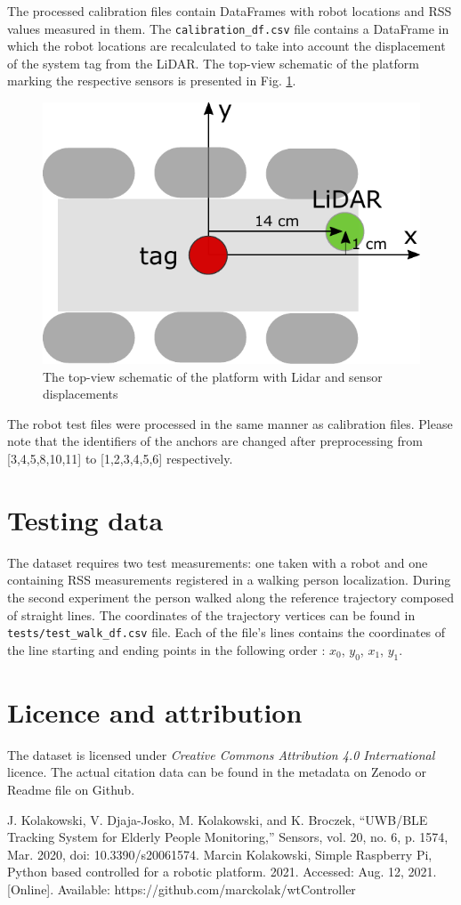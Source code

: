 \documentclass[conference, 11pt, onecolumn]{IEEEtran}
\begin{document}
The processed calibration files contain DataFrames with robot locations and RSS values measured in them. The \texttt{calibration\_df.csv} file contains a DataFrame in which the robot locations are recalculated to take into account the displacement of the system tag from the LiDAR. The top-view schematic of the platform marking the respective sensors is presented in Fig. \ref{fig:displacement}.
\begin{figure}[h]
\centering
\includegraphics[width=.5\columnwidth]{figs/displacement}
\caption{\label{fig:displacement}The top-view schematic of the platform with Lidar and sensor displacements}
\end{figure}

\noindent
The robot test files were processed in the same manner as calibration files.
\color{red}
Please note that the identifiers of the anchors are changed after preprocessing from [3,4,5,8,10,11] to [1,2,3,4,5,6] respectively.
\color{black}


\section{Testing data}
The dataset requires two test measurements: one taken with a robot and one containing RSS measurements registered in a walking person localization. During the second experiment the person walked along the reference trajectory composed of straight lines. The coordinates of the trajectory vertices can be found in \texttt{tests/test\_walk\_df.csv} file. Each of the file's lines contains the coordinates of the line starting and ending points in the following order : $x_0$, $y_0$, $x_1$, $y_1$.


\section{Licence and attribution}

The dataset is licensed under \textit{Creative Commons Attribution 4.0 International} licence. The actual citation data can be found in the metadata on Zenodo or Readme file on Github.


\begin{thebibliography}{00} 
 J. Kolakowski, V. Djaja-Josko, M. Kolakowski, and K. Broczek, “UWB/BLE Tracking System for Elderly People Monitoring,” Sensors, vol. 20, no. 6, p. 1574, Mar. 2020, doi: 10.3390/s20061574.
 Marcin Kolakowski, Simple Raspberry Pi, Python based controlled for a robotic platform. 2021. Accessed: Aug. 12, 2021. [Online]. Available: https://github.com/marckolak/wtController


\end{thebibliography}
\vspace{12pt}
\color{red}
\end{document}
